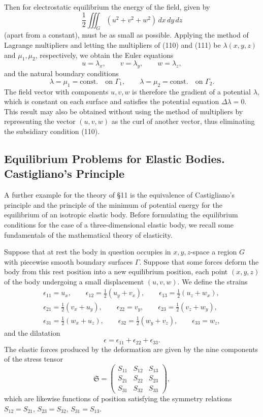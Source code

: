 Then for electrostatic equilibrium the energy of the field, given by
\[
\frac12\iiint_G(u^2+v^2+w^2)\,dx\,dy\,dz
\]
(apart from a constant), must be as small as possible. Applying the method of Lagrange multipliers and letting the multipliers of (110) and (111) be $\lambda(x,y,z)$ and $\mu_1,\mu_2$, respectively, we obtain the Euler equations
\begin{equation}\tag{112}
u=\lambda_x,\qquad v=\lambda_y,\qquad w=\lambda_z,
\end{equation}
and the natural boundary conditions
\begin{equation}\tag{113}
\lambda=\mu_1=\text{const.}\quad\text{on }\Gamma_1,
\qquad
\lambda=\mu_2=\text{const.}\quad\text{on }\Gamma_2.
\end{equation}
The field vector with components $u,v,w$ is therefore the gradient of a potential $\lambda$, which is constant on each surface and satisfies the potential equation $\Delta\lambda=0$. This result may also be obtained without using the method of multipliers by representing the vector $(u,v,w)$ as the curl of another vector, thus eliminating the subsidiary condition (110).

\subsection{Equilibrium Problems for Elastic Bodies. Castigliano's Principle}
A further example for the theory of \S11 is the equivalence of Castigliano's principle and the principle of the minimum of potential energy for the equilibrium of an isotropic elastic body. Before formulating the equilibrium conditions for the case of a three-dimensional elastic body, we recall some fundamentals of the mathematical theory of elasticity.

Suppose that at rest the body in question occupies in $x,y,z$-space a region $G$ with piecewise smooth boundary surfaces $\Gamma$. Suppose that some forces deform the body from this rest position into a new equilibrium position, each point $(x,y,z)$ of the body undergoing a small displacement $(u,v,w)$. We define the strains
\begin{equation}\tag{114}
\begin{gathered}
\epsilon_{11}=u_x,\qquad \epsilon_{12}=\tfrac12(u_y+v_x),\qquad \epsilon_{13}=\tfrac12(u_z+w_x),\\
\epsilon_{21}=\tfrac12(v_x+u_y),\qquad \epsilon_{22}=v_y,\qquad \epsilon_{23}=\tfrac12(v_z+w_y),\\
\epsilon_{31}=\tfrac12(w_x+u_z),\qquad \epsilon_{32}=\tfrac12(w_y+v_z),\qquad \epsilon_{33}=w_z,
\end{gathered}
\end{equation}
and the dilatation
\[
\epsilon=\epsilon_{11}+\epsilon_{22}+\epsilon_{33}.
\]
The elastic forces produced by the deformation are given by the nine components of the stress tensor
\[
\mathfrak S=
\begin{pmatrix}
S_{11}&S_{12}&S_{13}\\
S_{21}&S_{22}&S_{23}\\
S_{31}&S_{32}&S_{33}
\end{pmatrix},
\]
which are likewise functions of position satisfying the symmetry relations $S_{12}=S_{21}$, $S_{23}=S_{32}$, $S_{31}=S_{13}$.

